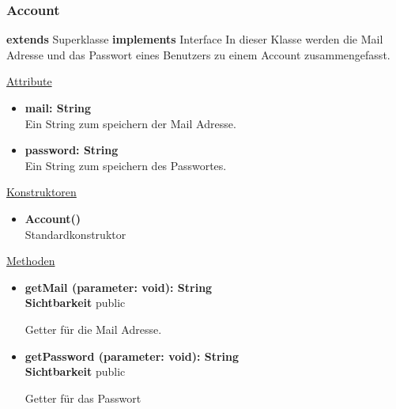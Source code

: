 \subsubsection{Account}
\textbf{extends} Superklasse \newline
\textbf{implements} Interface \newline
In dieser Klasse werden die Mail Adresse und das Passwort eines Benutzers zu einem Account zusammengefasst. \newline

\underline{Attribute}
\begin{itemize}
\itemsep0pt
\item \textbf{mail: String} \hfill\\ 
Ein String zum speichern der Mail Adresse.

\item \textbf{password: String} \hfill\\ 
Ein String zum speichern des Passwortes.

\end{itemize}

\underline{Konstruktoren}
\begin{itemize}
\itemsep0pt
\item \textbf{Account()} \hfill\\
Standardkonstruktor
\end{itemize}

\underline{Methoden}
\begin{itemize}
\itemsep0pt
\item \textbf{getMail (parameter: void): String}\hfill\\
\textbf{Sichtbarkeit} public

Getter für die Mail Adresse.

\item \textbf{getPassword (parameter: void): String}\hfill\\
\textbf{Sichtbarkeit} public

Getter für das Passwort

\end{itemize}
